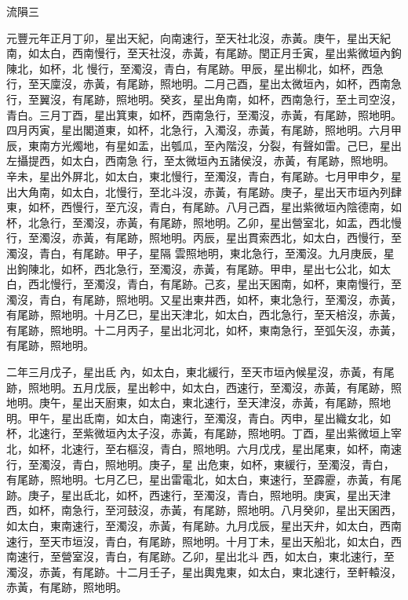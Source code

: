
\begin{pinyinscope}

 流隕三



 元豐元年正月丁卯，星出天紀，向南速行，至天社北沒，赤黃。庚午，星出天紀南，如太白，西南慢行，至天社沒，赤黃，有尾跡。閏正月壬寅，星出紫微垣內鉤陳北，如杯，北
 慢行，至濁沒，青白，有尾跡。甲辰，星出柳北，如杯，西急行，至天廩沒，赤黃，有尾跡，照地明。二月己酉，星出太微垣內，如杯，西南急行，至翼沒，有尾跡，照地明。癸亥，星出角南，如杯，西南急行，至土司空沒，青白。三月丁酉，星出箕東，如杯，西南急行，至濁沒，赤黃，有尾跡，照地明。四月丙寅，星出閣道東，如杯，北急行，入濁沒，赤黃，有尾跡，照地明。六月甲辰，東南方光燭地，有星如盂，出瓠瓜，至內階沒，分裂，有聲如雷。己巳，星出左攝提西，如太白，西南急
 行，至太微垣內五諸侯沒，赤黃，有尾跡，照地明。辛未，星出外屏北，如太白，東北慢行，至濁沒，青白，有尾跡。七月甲申夕，星出大角南，如太白，北慢行，至北斗沒，赤黃，有尾跡。庚子，星出天市垣內列肆東，如杯，西慢行，至亢沒，青白，有尾跡。八月己酉，星出紫微垣內陰德南，如杯，北急行，至濁沒，赤黃，有尾跡，照地明。乙卯，星出營室北，如盂，西北慢行，至濁沒，赤黃，有尾跡，照地明。丙辰，星出貫索西北，如太白，西慢行，至濁沒，青白，有尾跡。甲子，星隔
 雲照地明，東北急行，至濁沒。九月庚辰，星出鉤陳北，如杯，西北急行，至濁沒，赤黃，有尾跡。甲申，星出七公北，如太白，西北慢行，至濁沒，青白，有尾跡。己亥，星出天囷南，如杯，東南慢行，至濁沒，青白，有尾跡，照地明。又星出東井西，如杯，東北急行，至濁沒，赤黃，有尾跡，照地明。十月乙巳，星出天津北，如太白，西北急行，至天棓沒，赤黃，有尾跡，照地明。十二月丙子，星出北河北，如杯，東南急行，至弧矢沒，赤黃，有尾跡，照地明。



 二年三月戊子，星出氐
 內，如太白，東北緩行，至天市垣內候星沒，赤黃，有尾跡，照地明。五月戊辰，星出軫中，如太白，西速行，至濁沒，赤黃，有尾跡，照地明。庚午，星出天廚東，如太白，東北速行，至天津沒，赤黃，有尾跡，照地明。甲午，星出氐南，如太白，南速行，至濁沒，青白。丙申，星出織女北，如杯，北速行，至紫微垣內太子沒，赤黃，有尾跡，照地明。丁酉，星出紫微垣上宰北，如杯，北速行，至右樞沒，青白，照地明。六月戊戌，星出尾東，如杯，南速行，至濁沒，青白，照地明。庚子，星
 出危東，如杯，東緩行，至濁沒，青白，有尾跡，照地明。七月乙巳，星出雷電北，如太白，東速行，至霹靂，赤黃，有尾跡。庚子，星出氐北，如杯，西速行，至濁沒，青白，照地明。庚寅，星出天津西，如杯，南急行，至河鼓沒，赤黃，有尾跡，照地明。八月癸卯，星出天囷西，如太白，東南速行，至濁沒，赤黃，有尾跡。九月戊辰，星出天弁，如太白，西南速行，至天市垣沒，青白，有尾跡，照地明。十月丁未，星出天船北，如太白，西南速行，至營室沒，青白，有尾跡。乙卯，星出北斗
 西，如太白，東北速行，至濁沒，赤黃，有尾跡。十二月壬子，星出輿鬼東，如太白，東北速行，至軒轅沒，赤黃，有尾跡，照地明。




\end{pinyinscope}
